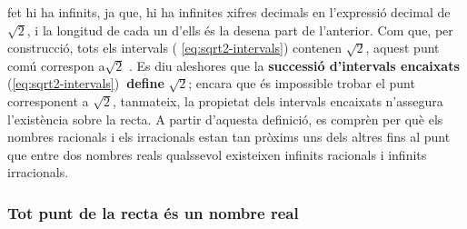 fet hi ha infinits, ja que, hi ha infinites xifres decimals en l’expressió
decimal de $\sqrt{2}$, i la longitud de cada un d’ells és la desena
part de l’anterior. Com que, per construcció, tots els intervals (%
\ref{eq:sqrt2-intervals}) contenen $\sqrt{2}$, aquest punt comú correspon a$\sqrt{2}$%
. Es diu aleshores que la \textbf{successió d’intervals encaixats }(\ref{eq:sqrt2-intervals})\textbf{\ define} $\sqrt{2}$; encara que és impossible trobar el punt
corresponent a $\sqrt{2}$, tanmateix, la propietat dels intervals
encaixats n’assegura l’existència sobre la recta. A partir d’aquesta definició, es comprèn per què els nombres racionals i els
irracionals estan tan pròxims uns dels altres fins al punt que
entre dos nombres reals qualssevol existeixen infinits racionals i
infinits irracionals.

\subsubsection{Tot punt de la recta és un nombre real}

